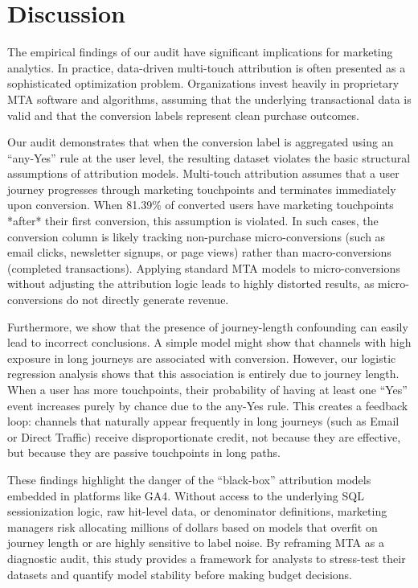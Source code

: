 \documentclass[pdflatex,sn-basic,Numbered]{sn-jnl}
\begin{document}
\section{Discussion}\label{sec:discussion}

The empirical findings of our audit have significant implications for marketing analytics. In practice, data-driven multi-touch attribution is often presented as a sophisticated optimization problem. Organizations invest heavily in proprietary MTA software and algorithms, assuming that the underlying transactional data is valid and that the conversion labels represent clean purchase outcomes.

Our audit demonstrates that when the conversion label is aggregated using an ``any-Yes'' rule at the user level, the resulting dataset violates the basic structural assumptions of attribution models. Multi-touch attribution assumes that a user journey progresses through marketing touchpoints and terminates immediately upon conversion. When 81.39\% of converted users have marketing touchpoints *after* their first conversion, this assumption is violated. In such cases, the conversion column is likely tracking non-purchase micro-conversions (such as email clicks, newsletter signups, or page views) rather than macro-conversions (completed transactions). Applying standard MTA models to micro-conversions without adjusting the attribution logic leads to highly distorted results, as micro-conversions do not directly generate revenue.

Furthermore, we show that the presence of journey-length confounding can easily lead to incorrect conclusions. A simple model might show that channels with high exposure in long journeys are associated with conversion. However, our logistic regression analysis shows that this association is entirely due to journey length. When a user has more touchpoints, their probability of having at least one ``Yes'' event increases purely by chance due to the any-Yes rule. This creates a feedback loop: channels that naturally appear frequently in long journeys (such as Email or Direct Traffic) receive disproportionate credit, not because they are effective, but because they are passive touchpoints in long paths.

These findings highlight the danger of the ``black-box'' attribution models embedded in platforms like GA4. Without access to the underlying SQL sessionization logic, raw hit-level data, or denominator definitions, marketing managers risk allocating millions of dollars based on models that overfit on journey length or are highly sensitive to label noise. By reframing MTA as a diagnostic audit, this study provides a framework for analysts to stress-test their datasets and quantify model stability before making budget decisions.
\end{document}
